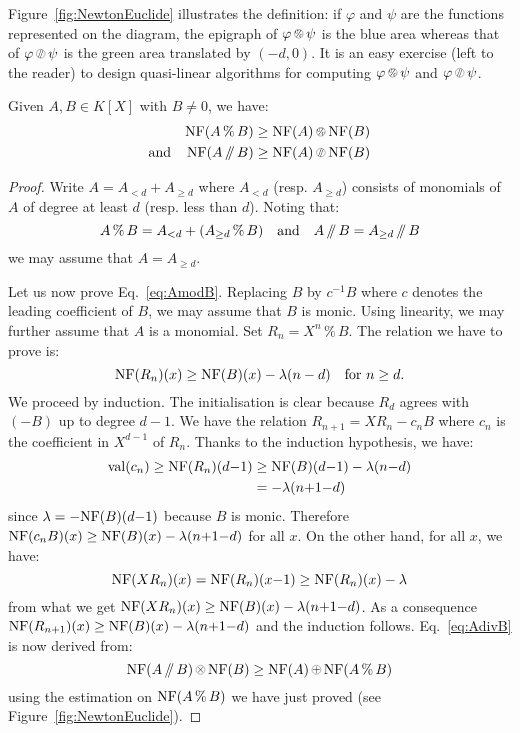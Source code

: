 \documentclass{sig-alternate-2013}
\DeclareMathOperator{\val}{val}
\newcommand{\NF}{\text{\rm NF}}
\renewcommand{\mod}{\,\%\,}
\renewcommand{\div}{\,/\hspace{-0.3em}/\,}
\newcommand{\nfop}[1]{%
\raisebox{-0.1mm}{\begin{tikzpicture}
\draw[transparent] (-0.18,0)--(0.18,0);
\draw[very thin] (0,0) circle (0.11cm);
\begin{scope}
\clip (0,0) circle (0.11cm);
\node[scale=0.75] at (0,0) { $#1$ };
\end{scope}
\end{tikzpicture}}}
\newcommand{\nfplus}{\nfop+}
\newcommand{\nftimes}{\nfop\times}
\newcommand{\nfmod}{\nfop\mod}
\newcommand{\nfdiv}{\nfop\div}
\begin{document}
Figure~\ref{fig:NewtonEuclide} illustrates the definition: if $\varphi$ 
and $\psi$ are the functions represented on the diagram, the epigraph of 
$\varphi \nfmod \psi$ is the blue area whereas that of $\varphi \nfdiv \psi$ 
is the green area translated by $(-d,0)$.
It is an easy exercise (left to the reader) to design quasi-linear
algorithms for computing $\varphi \nfmod \psi$ and $\varphi \nfdiv \psi$.

\begin{theo}
\label{theo:EDivisionNP}
Given $A, B \in K[X]$ with $B \neq 0$, we have:
\begin{align}
\NF(A \mod B) & \geq \NF(A) \nfmod \NF(B) \label{eq:AmodB} \\
\text{and} \hspace{4mm}
\NF(A \div B) & \geq \NF(A) \nfdiv \NF(B) \label{eq:AdivB}
\end{align}
\end{theo}

\begin{proof}
Write $A = A_{<d} + A_{\geq d}$ where $A_{<d}$ (resp. $A_{\geq d}$)
consists of monomials of $A$ of degree at least $d$ (resp. less than
$d$). Noting that:
$$A \mod B = A_{<d} + (A_{\geq d} \mod B)
\quad \text{and} \quad
A \div B = A_{\geq d} \div B$$
we may assume that $A = A_{\geq d}$.

Let us now prove Eq.~\eqref{eq:AmodB}. 
Replacing $B$ by $c^{-1} B$ where $c$ denotes the leading coefficient
of $B$, we may assume that $B$ is monic. Using linearity, we may further
assume that $A$ is a monomial. Set $R_n = X^n \mod B$. The relation
we have to prove is:
$$\NF(R_n)(x) \geq \NF(B)(x) - \lambda(n-d)
\quad \text{for } n\geq d.$$
We proceed by induction. The initialisation is clear because $R_d$
agrees with $(-B)$ up to degree $d{-}1$. We have the relation
$R_{n+1} = X R_n - c_n B$
where $c_n$ is the coefficient in $X^{d-1}$ of $R_n$. Thanks to the
induction hypothesis, we have:
\begin{align*}
\val(c_n) \geq \NF(R_n)(d{-}1) & \geq \NF(B)(d{-}1) - \lambda(n{-}d) \\
& = - \lambda(n{+}1{-}d)
\end{align*}
since $\lambda = -\NF(B)(d{-}1)$ because $B$ is monic. Therefore
$\NF(c_n B)(x) \geq \NF(B)(x) - \lambda(n{+}1{-}d)$ for all $x$. On the 
other hand, for all $x$, we have:
$$\NF(X R_n)(x) = \NF(R_n)(x{-}1) \geq \NF(R_n)(x) - \lambda$$
from what we get $\NF(X R_n)(x) \geq \NF(B)(x) - \lambda(n{+}1{-}d)$. As a
consequence
$\NF(R_{n+1})(x) \geq \NF(B)(x) - \lambda(n{+}1{-}d)$
and the induction follows.
Eq.~\eqref{eq:AdivB} is now derived from:
$$\NF(A \div B) \nftimes \NF(B) \geq \NF(A) \nfplus \NF(A \mod B)$$
using the estimation on $\NF(A\mod B)$ we have just proved
(see Figure~\ref{fig:NewtonEuclide}).
\end{proof}
\end{document}
